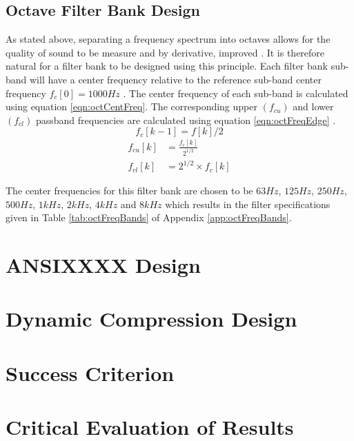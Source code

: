 \documentclass[12pt, onecolumn]{article}
\begin{document}
\subsection{Octave Filter Bank Design}
\label{sec:octDesign}

\noindent As stated above, separating a frequency spectrum into octaves allows for the quality of sound to be measure and by derivative, improved \cite{octave}. It is therefore natural for a filter bank to be designed using this principle. Each filter bank sub-band will have a center frequency relative to the reference sub-band center frequency $f_c [0] = 1000Hz$ \cite{octFreqCalc}. The center frequency of each sub-band is calculated using equation \ref{eqn:octCentFreq}. The corresponding upper $(f_{cu})$ and lower $(f_{cl})$ passband frequencies are calculated using equation \ref{eqn:octFreqEdge} \cite{octFreqCalc}.
%
\begin{equation}
\label{eqn:octCentFreq}
f_c[k-1] = f[k]/2 
\end{equation}
\begin{equation}
\begin{aligned}
\label{eqn:octFreqEdge}
f_{cu}[k] &= \frac{f_c[k] }{2^{1/2}}\\
f_{cl}[k] &= 2^{1/2}\times f_c[k]
\end{aligned}
\end{equation}
%

\noindent The center frequencies for this filter bank are chosen to be $63Hz$, $125Hz$, $250Hz$, $500Hz$, $1kHz$, $2kHz$, $4kHz$ and $8kHz$ which results in the filter specifications given in Table \ref{tab:octFreqBands} of Appendix \ref{app:octFreqBands}.

\section{ANSIXXXX Design}
\label{sec:ansi}

\section{Dynamic Compression Design}

\section{Success Criterion}


\section{Critical Evaluation of Results}
\end{document}
